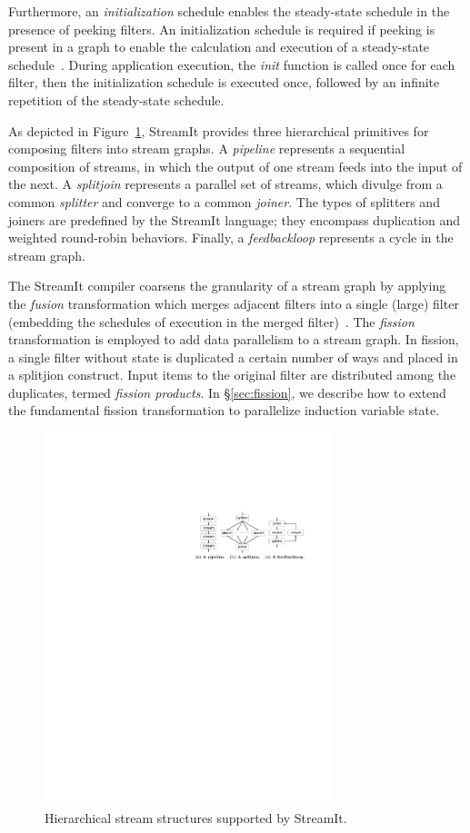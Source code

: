 Furthermore, an {\it initialization} schedule enables the steady-state
schedule in the presence of peeking filters.  An initialization
schedule is required if peeking is present in a graph to enable the
calculation and execution of a steady-state
schedule~\cite{karczmarek-lctes03}.  During application execution, the
{\it init} function is called once for each filter, then the
initialization schedule is executed once, followed by an infinite
repetition of the steady-state schedule.

As depicted in Figure~\ref{fig:structures}, StreamIt provides three
hierarchical primitives for composing filters into stream graphs.  A
{\it pipeline} represents a sequential composition of streams, in
which the output of one stream feeds into the input of the next.  A
{\it splitjoin} represents a parallel set of streams, which divulge
from a common {\it splitter} and converge to a common {\it joiner}.
The types of splitters and joiners are predefined by the StreamIt
language; they encompass duplication and weighted round-robin
behaviors.  Finally, a {\it feedbackloop} represents a cycle in the
stream graph.

The StreamIt compiler coarsens the granularity of a stream graph by
applying the {\it fusion} transformation which merges adjacent filters
into a single (large) filter (embedding the schedules of execution in
the merged filter)~\cite{streamit-asplos}.  The {\it fission}
transformation is employed to add data parallelism to a stream graph.
In fission, a single filter without state is duplicated a certain
number of ways and placed in a splitjion construct.  Input items to
the original filter are distributed among the duplicates, termed {\it
  fission products}.  In \S\ref{sec:fission}, we describe how to
extend the fundamental fission transformation to parallelize induction
variable state.

\begin{figure}[t!]
\centering
\includegraphics[width=3.3in]{stream-structures.pdf}
\caption{Hierarchical stream structures supported by
  StreamIt.\protect\label{fig:structures}}
\vspace{-8pt}
\end{figure}

